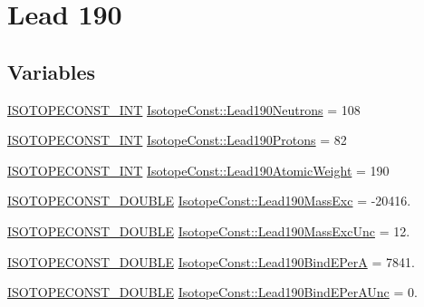 \hypertarget{group___isotope_const-_lead-_pb190}{}\section{Lead 190}
\label{group___isotope_const-_lead-_pb190}
\subsection*{Variables}
\begin{DoxyCompactItemize}
\item 
\mbox{\hyperlink{group___isotope_const-_macros_ga5f18360b3e99483a35c32d789e62621c}{I\+S\+O\+T\+O\+P\+E\+C\+O\+N\+S\+T\+\_\+\+I\+NT}} \mbox{\hyperlink{group___isotope_const-_lead-_pb190_ga215894c091d7fdf0defae8858bbc9d62}{Isotope\+Const\+::\+Lead190\+Neutrons}} = 108
\item 
\mbox{\hyperlink{group___isotope_const-_macros_ga5f18360b3e99483a35c32d789e62621c}{I\+S\+O\+T\+O\+P\+E\+C\+O\+N\+S\+T\+\_\+\+I\+NT}} \mbox{\hyperlink{group___isotope_const-_lead-_pb190_ga9602d713931a3a03e481d0d03dbfb9f4}{Isotope\+Const\+::\+Lead190\+Protons}} = 82
\item 
\mbox{\hyperlink{group___isotope_const-_macros_ga5f18360b3e99483a35c32d789e62621c}{I\+S\+O\+T\+O\+P\+E\+C\+O\+N\+S\+T\+\_\+\+I\+NT}} \mbox{\hyperlink{group___isotope_const-_lead-_pb190_ga58e18ba8c94ab1d792b5a43f660171c0}{Isotope\+Const\+::\+Lead190\+Atomic\+Weight}} = 190
\item 
\mbox{\hyperlink{group___isotope_const-_macros_ga8f45a7272ce02c0b4c65c44636ed719a}{I\+S\+O\+T\+O\+P\+E\+C\+O\+N\+S\+T\+\_\+\+D\+O\+U\+B\+LE}} \mbox{\hyperlink{group___isotope_const-_lead-_pb190_ga24e7a32ac11f41f431c8ce73161474d4}{Isotope\+Const\+::\+Lead190\+Mass\+Exc}} = -\/20416.
\item 
\mbox{\hyperlink{group___isotope_const-_macros_ga8f45a7272ce02c0b4c65c44636ed719a}{I\+S\+O\+T\+O\+P\+E\+C\+O\+N\+S\+T\+\_\+\+D\+O\+U\+B\+LE}} \mbox{\hyperlink{group___isotope_const-_lead-_pb190_ga5d82d99e2829bb4bc15bcf83b9c652f7}{Isotope\+Const\+::\+Lead190\+Mass\+Exc\+Unc}} = 12.
\item 
\mbox{\hyperlink{group___isotope_const-_macros_ga8f45a7272ce02c0b4c65c44636ed719a}{I\+S\+O\+T\+O\+P\+E\+C\+O\+N\+S\+T\+\_\+\+D\+O\+U\+B\+LE}} \mbox{\hyperlink{group___isotope_const-_lead-_pb190_ga51582606c532e7752837a0907ca89da2}{Isotope\+Const\+::\+Lead190\+Bind\+E\+PerA}} = 7841.
\item 
\mbox{\hyperlink{group___isotope_const-_macros_ga8f45a7272ce02c0b4c65c44636ed719a}{I\+S\+O\+T\+O\+P\+E\+C\+O\+N\+S\+T\+\_\+\+D\+O\+U\+B\+LE}} \mbox{\hyperlink{group___isotope_const-_lead-_pb190_ga70e1d061c2c76494687b195dfb6c9310}{Isotope\+Const\+::\+Lead190\+Bind\+E\+Per\+A\+Unc}} = 0.

\end{DoxyCompactItemize}
